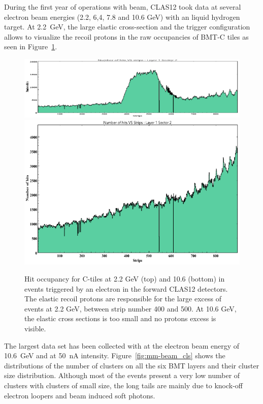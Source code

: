 During the first year of operations with beam, CLAS12 took data at several electron beam energies (2.2, 6,4, 7.8 and 10.6 GeV) with an liquid hydrogen target. At 2.2~GeV, the large elastic cross-section and the trigger configuration allows to visualize the recoil protons in the raw occupancies of BMT-C tiles as seen in Figure~\ref{fig:mm-occupancy_22_10}. 

\begin{figure}[htb]
 \includegraphics[width=1.0\columnwidth,keepaspectratio]{images/occupancy2GeV.png}
 \includegraphics[width=1.0\columnwidth,height=0.3\columnwidth]{images/occupancy10GeV.png}
 \caption{Hit occupancy for C-tiles at 2.2 GeV (top) and 10.6 (bottom) in events triggered by an electron in the forward CLAS12 detectors. The elastic recoil protons are responsible for the large excess of events at 2.2 GeV, between strip number 400 and 500. At 10.6 GeV, the elastic cross sections is too small and no protons excess is visible.  }
 \label{fig:mm-occupancy_22_10}
\end{figure}

The largest data set has been collected with at the electron beam energy of 10.6~GeV and at 50~nA intensity. Figure~\ref{fig:mm-beam_cls} shows the distributions of the number of clusters on all the six BMT layers and their cluster size distribution. Although most of the events present a very low number of clusters with clusters of small size, the long tails are mainly due to knock-off electron loopers and beam induced soft photons.

